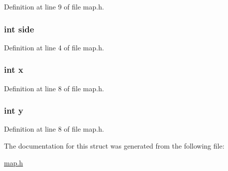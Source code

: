 Definition at line 9 of file map.\-h.

\hypertarget{structmap__t_a2d7431eddd5ca6d1ac206533ee0bad0e}{
\subsubsection[{side}]{\setlength{\rightskip}{0pt plus 5cm}int side}}\label{structmap__t_a2d7431eddd5ca6d1ac206533ee0bad0e}


Definition at line 4 of file map.\-h.

\hypertarget{structmap__t_a6150e0515f7202e2fb518f7206ed97dc}{
\subsubsection[{x}]{\setlength{\rightskip}{0pt plus 5cm}int x}}\label{structmap__t_a6150e0515f7202e2fb518f7206ed97dc}


Definition at line 8 of file map.\-h.

\hypertarget{structmap__t_a0a2f84ed7838f07779ae24c5a9086d33}{
\subsubsection[{y}]{\setlength{\rightskip}{0pt plus 5cm}int y}}\label{structmap__t_a0a2f84ed7838f07779ae24c5a9086d33}


Definition at line 8 of file map.\-h.



The documentation for this struct was generated from the following file\-:\begin{DoxyCompactItemize}
\item 
\hyperlink{map_8h}{map.\-h}\end{DoxyCompactItemize}
